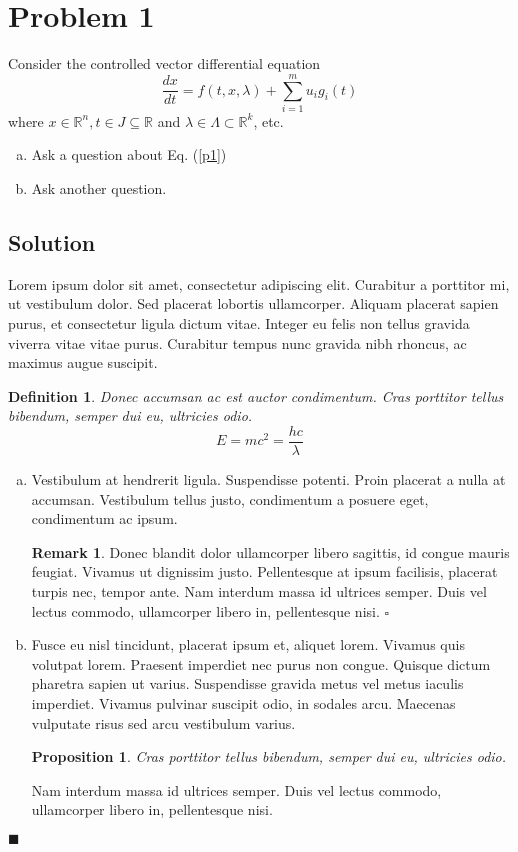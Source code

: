 \documentclass[11pt]{article}
\newcommand*{\QEDB}{\hfill\ensuremath{\blacksquare}}
\newcommand*{\QEDA}{\hfill\ensuremath{\square}}
\newtheorem{defn}[theorem]{Definition}
\newtheorem{proposition}[theorem]{Proposition}
\theoremstyle{definition}
\newtheorem{remark}{Remark}
\newcommand{\xlr}[2]{#1 \left(#2\right)}
\newcommand {\mb}[1]{\ensuremath{\mathbb #1}}
\begin{document}

\section*{Problem 1} \setcounter{section}{1}
Consider the controlled vector differential equation
\begin{equation}
\label{p1}
\frac{dx}{dt} = \xlr{f}{t,x,\lambda} + \sum \limits_{i = 1}^m u_i \xlr{g_i}{t}
\end{equation}
where \(x \in \mb R ^n, t \in J \subseteq \mb R\) and \(\lambda \in \Lambda \subset \mb R ^k \), etc.  
\begin{enumerate}[(a), noitemsep]
	\item Ask a question about Eq. (\ref{p1})
	\item Ask another question.
\end{enumerate}

\subsection*{Solution}
Lorem ipsum dolor sit amet, consectetur adipiscing elit. Curabitur a porttitor mi, ut vestibulum dolor. Sed placerat lobortis ullamcorper. Aliquam placerat sapien purus, et consectetur ligula dictum vitae. Integer eu felis non tellus gravida viverra vitae vitae purus. Curabitur tempus nunc gravida nibh rhoncus, ac maximus augue suscipit.

\begin{defn}
	Donec accumsan ac est auctor condimentum. Cras porttitor tellus bibendum, semper dui eu, ultricies odio.
	\begin{equation}
			E= mc^2 = \frac{hc}{\lambda}
	\end{equation}
\end{defn}

\begin{enumerate}[(a), noitemsep]
	\item Vestibulum at hendrerit ligula. Suspendisse potenti. Proin placerat a nulla at accumsan. Vestibulum tellus justo, condimentum a posuere eget, condimentum ac ipsum.
	\begin{remark}
		Donec blandit dolor ullamcorper libero sagittis, id congue mauris feugiat. Vivamus ut dignissim justo. Pellentesque at ipsum facilisis, placerat turpis nec, tempor ante. Nam interdum massa id ultrices semper. Duis vel lectus commodo, ullamcorper libero in, pellentesque nisi. \QEDA
	\end{remark} 
	\item Fusce eu nisl tincidunt, placerat ipsum et, aliquet lorem. Vivamus quis volutpat lorem. Praesent imperdiet nec purus non congue. Quisque dictum pharetra sapien ut varius. Suspendisse gravida metus vel metus iaculis imperdiet. Vivamus pulvinar suscipit odio, in sodales arcu. Maecenas vulputate risus sed arcu vestibulum varius.
	\begin{proposition}
		Cras porttitor tellus bibendum, semper dui eu, ultricies odio. 
	\end{proposition}
	Nam interdum massa id ultrices semper. Duis vel lectus commodo, ullamcorper libero in, pellentesque nisi. 
\end{enumerate} \QEDB

\end{document}
